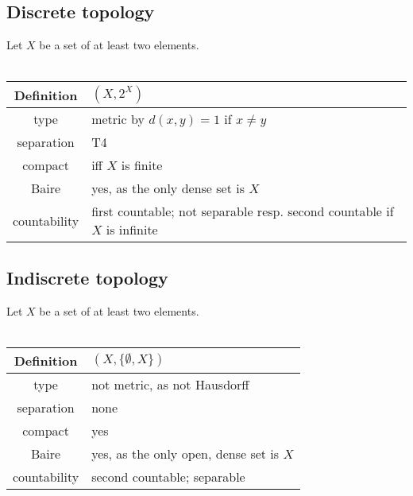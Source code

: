 \documentclass{scrartcl}
\begin{document}
\subsection{Discrete topology}
\label{top:discrete}
Let $X$ be a set of at least two elements.
\\\\
\begin{tabular}{c | p{}}
    Definition & $(X, 2^X)$ \\
    \hline
    type & metric by $d(x,y) = 1$ if $x \neq y$ \\
    separation & T4 \\
    compact & iff $X$ is finite \\
    Baire & yes, as the only dense set is $X$ \\
    countability & first countable; not separable resp. second countable if $X$ is infinite
\end{tabular}

\subsection{Indiscrete topology}
\label{top:discrete}
Let $X$ be a set of at least two elements.
\\\\
\begin{tabular}{c | p{}}
    Definition & $(X, \{\emptyset, X\})$ \\
    \hline
    type & not metric, as not Hausdorff \\
    separation & none \\
    compact & yes \\
    Baire & yes, as the only open, dense set is $X$ \\
    countability & second countable; separable
\end{tabular}
\end{document}
